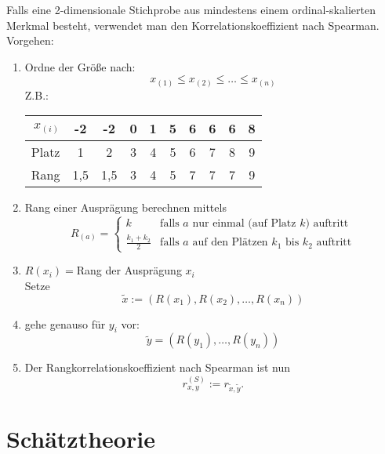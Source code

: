 \documentclass{scrreprt}
\begin{document}
 Falls eine 2-dimensionale Stichprobe aus mindestens einem ordinal-skalierten Merkmal besteht, verwendet man den Korrelationskoeffizient nach Spearman.\\
Vorgehen:
\begin{enumerate}
\item Ordne der Größe nach:
$$x_{(1)}\leq x_{(2)} \leq \ldots \leq x_{(n)}$$
Z.B.:\\
\begin{tabular}{r | c c c c c c c c c}
$x_{(i)}$ & -2 & -2 & 0 & 1 &  5 & 6 &6 &6 &8\\\hline
Platz & 1 & 2 & 3 &4 &5 & 6 & 7 &8 &9\\
Rang & 1,5 & 1,5& 3 &4 &5 &7 &7 &7 &9
\end{tabular}
\item Rang einer Ausprägung berechnen mittels
$$R_(a) = \begin{cases}
k & \text{falls }a\text{ nur einmal (auf Platz }k\text{) auftritt}\\
\frac{k_1+k_2}{2} & \text{falls }a\text{ auf den Plätzen }k_1\text{ bis }k_2\text{ auftritt}
\end{cases}$$
\item $R(x_i)=$Rang der Ausprägung $x_i$\\
Setze $$\tilde{x}:= (R(x_1),R(x_2), \ldots, R(x_n))$$
\item gehe genauso für $y_i$ vor:
$$\tilde{y}=(R(y_1),\ldots, R(y_n))$$
\item Der Rangkorrelationskoeffizient nach Spearman ist nun
$$r_{x,y}^{(S)} := r_{\tilde{x},\tilde{y}}\text{.}$$
\end{enumerate}

\section{Schätztheorie}
\end{document}
